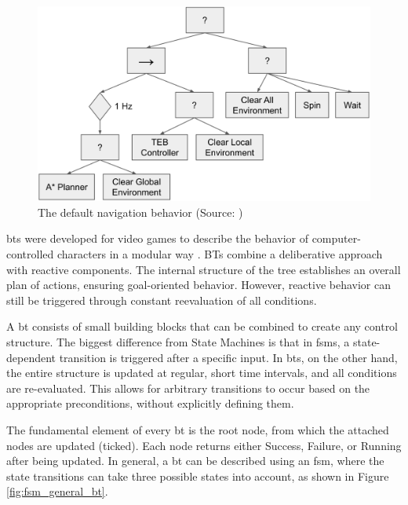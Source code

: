 \begin{figure}[h]
    \centering
    \includegraphics[width=\textwidth]{figures/02_state_of_the_art/nav2_bt.png}
    \caption[The default navigation behavior]{The default navigation behavior (Source: \cite{Marathon})}
    \label{fig:nav2_bt}
\end{figure}

\Glspl{bt} were developed for video games to describe the behavior of computer-controlled characters in a modular way \cite{Limetal.,2010}. BTs combine a deliberative approach with reactive components. The internal structure of the tree establishes an overall plan of actions, ensuring goal-oriented behavior. However, reactive behavior can still be triggered through constant reevaluation of all conditions. 

A \gls{bt} consists of small building blocks that can be combined to create any control structure. The biggest difference from State Machines is that in \glspl{fsm}, a state-dependent transition is triggered after a specific input. In \glspl{bt}, on the other hand, the entire structure is updated at regular, short time intervals, and all conditions are re-evaluated. This allows for arbitrary transitions to occur based on the appropriate preconditions, without explicitly defining them.

The fundamental element of every \gls{bt} is the root node, from which the attached nodes are updated (ticked). Each node returns either Success, Failure, or Running after being updated. In general, a \gls{bt} can be described using an \gls{fsm}, where the state transitions can take three possible states into account, as shown in Figure \ref{fig:fsm_general_bt}.

